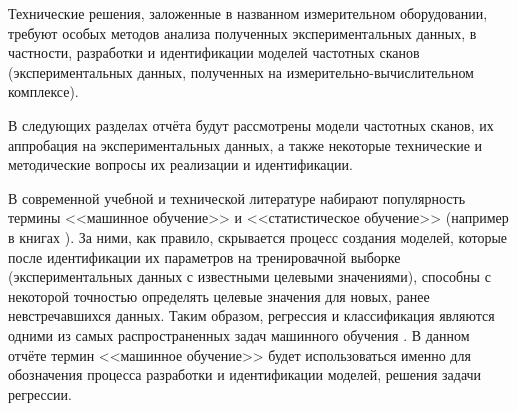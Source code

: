 Технические решения, заложенные в названном измерительном оборудовании, требуют
особых методов анализа полученных экспериментальных данных, в частности,
разработки и идентификации моделей частотных сканов (экспериментальных данных, 
полученных на измерительно-вычислительном комплексе).

В следующих разделах отчёта будут рассмотрены модели частотных сканов, их
аппробация на экспериментальных данных, а также некоторые технические и 
методические вопросы их реализации и идентификации.

В современной учебной и технической литературе набирают популярность термины 
<<машинное обучение>> и <<статистическое обучение>> (например в книгах 
\cite{hands_on_ml, nikolenko_deep_learning, elements_of_statistical_learning}). 
За ними, как правило, скрывается процесс создания моделей, которые после 
идентификации их параметров на тренировачной выборке (экспериментальных данных 
с известными целевыми значениями), способны с некоторой точностью определять 
целевые значения для новых, ранее невстречавшихся данных. Таким образом, 
регрессия и классификация являются одними из самых распространенных задач 
машинного обучения \cite{hands_on_ml}. В данном отчёте термин <<машинное 
обучение>> будет использоваться именно для обозначения процесса разработки и 
идентификации моделей, решения задачи регрессии.
